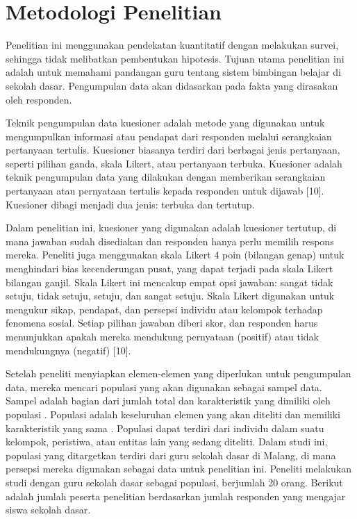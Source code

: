 \section{Metodologi Penelitian}

    Penelitian ini menggunakan pendekatan kuantitatif dengan melakukan survei, sehingga tidak melibatkan pembentukan hipotesis. Tujuan utama penelitian ini adalah untuk memahami pandangan guru tentang sistem bimbingan belajar di sekolah dasar. Pengumpulan data akan didasarkan pada fakta yang dirasakan oleh responden. 
    
    Teknik pengumpulan data kuesioner adalah metode yang digunakan untuk mengumpulkan informasi atau pendapat dari responden melalui serangkaian pertanyaan tertulis. Kuesioner biasanya terdiri dari berbagai jenis pertanyaan, seperti pilihan ganda, skala Likert, atau pertanyaan terbuka. Kuesioner adalah teknik pengumpulan data yang dilakukan dengan memberikan serangkaian pertanyaan atau pernyataan tertulis kepada responden untuk dijawab [10]. Kuesioner dibagi menjadi dua jenis: terbuka dan tertutup.
    
    Dalam penelitian ini, kuesioner yang digunakan adalah kuesioner tertutup, di mana jawaban sudah disediakan dan responden hanya perlu memilih respons mereka. Peneliti juga menggunakan skala Likert 4 poin (bilangan genap) untuk menghindari bias kecenderungan pusat, yang dapat terjadi pada skala Likert bilangan ganjil. Skala Likert ini mencakup empat opsi jawaban: sangat tidak setuju, tidak setuju, setuju, dan sangat setuju. Skala Likert digunakan untuk mengukur sikap, pendapat, dan persepsi individu atau kelompok terhadap fenomena sosial. Setiap pilihan jawaban diberi skor, dan responden harus menunjukkan apakah mereka mendukung pernyataan (positif) atau tidak mendukungnya (negatif) [10].
    
    Setelah peneliti menyiapkan elemen-elemen yang diperlukan untuk pengumpulan data, mereka mencari populasi yang akan digunakan sebagai sampel data. Sampel adalah bagian dari jumlah total dan karakteristik yang dimiliki oleh populasi \citep{Turner2020}. Populasi adalah keseluruhan elemen yang akan diteliti dan memiliki karakteristik yang sama \citep{Norman2024}. Populasi dapat terdiri dari individu dalam suatu kelompok, peristiwa, atau entitas lain yang sedang diteliti. Dalam studi ini, populasi yang ditargetkan terdiri dari guru sekolah dasar di Malang, di mana persepsi mereka digunakan sebagai data untuk penelitian ini. Peneliti melakukan studi dengan guru sekolah dasar sebagai populasi, berjumlah 20 orang. Berikut adalah jumlah peserta penelitian berdasarkan jumlah responden yang mengajar siswa sekolah dasar.

